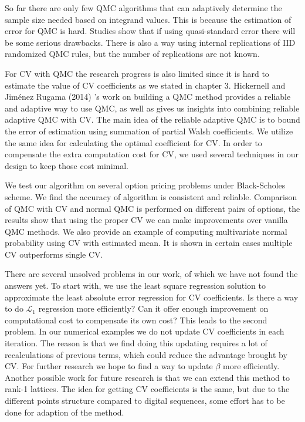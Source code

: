 

So far there are only few QMC algorithms that can adaptively determine the sample size needed based on integrand values. 
This is because the estimation of error for QMC is hard. 
Studies show that if using quasi-standard error there will be some serious drawbacks\cite{owen2006warnock}. 
There is also a way using internal replications of IID randomized QMC rules, but the number of replications are not known\cite{hickernell2005control}.

For CV with QMC the research progress is also limited since it is hard to estimate the value of CV coefficients as we stated in chapter 3. 
Hickernell and Jim{\'e}nez Rugama (2014) \cite{hickernell2014reliable}'s work on building a QMC method provides a reliable and adaptive way to use QMC, as well as 
gives us insights into combining reliable adaptive QMC with CV.    
The main idea of the reliable adaptive QMC is to bound the error of estimation using summation of partial Walsh coefficients. 
We utilize the same idea for calculating the optimal coefficient for CV.  
In order to compensate the extra computation cost for CV, we used several techniques in our design to keep those cost minimal.

We test our algorithm on several option pricing problems under Black-Scholes scheme. We find the accuracy of algorithm is consistent and reliable. 
Comparison of QMC with CV and normal QMC is performed on different pairs of options, the results show that using the proper CV we can make improvements over vanilla QMC methods. 
We also provide an example of computing multivariate normal probability using CV with estimated mean. It is shown in certain cases multiple CV outperforms single CV.       

\newpage


There are several unsolved problems in our work, of which we have not found the answers yet. 
To start with, we use the least square regression solution to approximate the least absolute error regression for CV coefficients. 
Is there a way to do $\mathcal{L}_1$ regression more efficiently? Can it offer enough improvement on computational cost to compensate its own cost?    
This leads to the second problem. In our numerical examples we do not update CV coefficients in each iteration. 
The reason is that we find doing this updating requires a lot of recalculations of previous terms, which could reduce the advantage brought by CV. For further research we hope to find a way to update $\beta$ more efficiently.      
Another possible work for future research is that we can extend this method to rank-1 lattices\cite{rugama2014adaptive}. 
The idea for getting CV coefficients is the same, but due to the different points structure compared to digital sequences, some effort has to be done for adaption of the method.  
